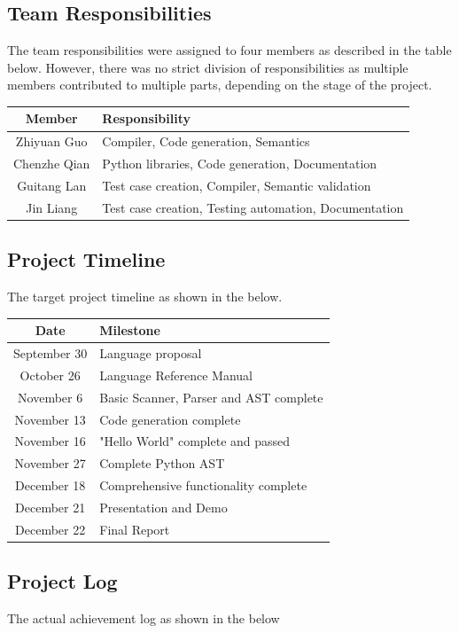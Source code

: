 \documentclass[12pt]{article} %
\begin{document}
\subsection{Team Responsibilities}
The team responsibilities were assigned to four members as described in the table below. However, there was no strict division of responsibilities as multiple members contributed to multiple parts, depending on the stage of the project.

\begin{tabular}{| c | l |}
	\hline
	Member & Responsibility \\
	\hline
	Zhiyuan Guo & Compiler, Code generation, Semantics \\
	Chenzhe Qian & Python libraries, Code generation, Documentation \\
	Guitang Lan & Test case creation, Compiler, Semantic validation \\
	Jin Liang & Test case creation, Testing automation, Documentation \\
	\hline
\end{tabular}

\subsection{Project Timeline}
The target project timeline as shown in the below.

\begin{tabular}{| c | l |}
	\hline
	Date & Milestone \\
	\hline
	September 30 & Language proposal \\
	October 26 & Language Reference Manual \\
	November 6 & Basic Scanner, Parser and AST complete \\
	November 13 & Code generation complete \\
	November 16 & "Hello World" complete and passed \\
	November 27 & Complete Python AST \\
	December 18 & Comprehensive functionality complete \\
	December 21 & Presentation and Demo \\ 
	December 22 & Final Report \\
	\hline
\end{tabular}


\subsection{Project Log}
The actual achievement log as shown in the below
\end{document}
